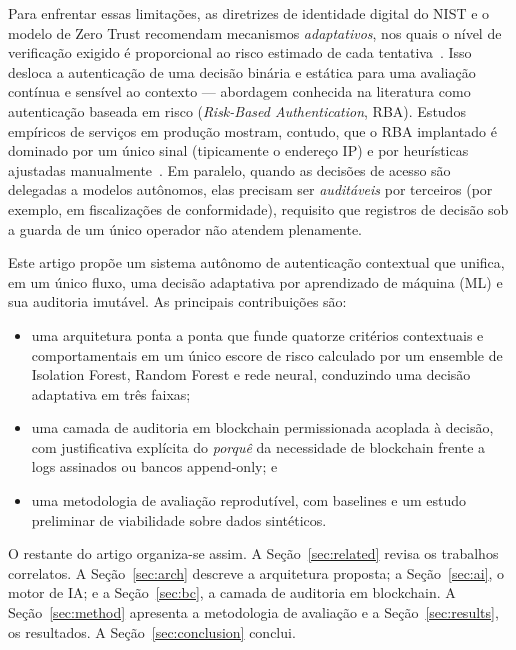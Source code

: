 \documentclass[conference]{IEEEtran}
\begin{document}
Para enfrentar essas limitações, as diretrizes de identidade digital do
NIST e o modelo de Zero Trust recomendam mecanismos \emph{adaptativos},
nos quais o nível de verificação exigido é proporcional ao risco
estimado de cada tentativa~\cite{nist80063b,rose2020}. Isso desloca a
autenticação de uma decisão binária e estática para uma avaliação
contínua e sensível ao contexto --- abordagem conhecida na literatura
como autenticação baseada em risco (\emph{Risk-Based Authentication},
RBA). Estudos empíricos de serviços em produção mostram, contudo, que o
RBA implantado é dominado por um único sinal (tipicamente o endereço IP)
e por heurísticas ajustadas manualmente~\cite{wiefling2019,wiefling2023}.
Em paralelo, quando as decisões de acesso são delegadas a modelos
autônomos, elas precisam ser \emph{auditáveis} por terceiros (por
exemplo, em fiscalizações de conformidade), requisito que registros de
decisão sob a guarda de um único operador não atendem plenamente.

Este artigo propõe um sistema autônomo de autenticação contextual que
unifica, em um único fluxo, uma decisão adaptativa por aprendizado de
máquina (ML) e sua auditoria imutável. As principais contribuições são:
\begin{itemize}
  \item uma arquitetura ponta a ponta que funde quatorze critérios
        contextuais e comportamentais em um único escore de risco
        calculado por um ensemble de Isolation Forest, Random Forest e
        rede neural, conduzindo uma decisão adaptativa em três faixas;
  \item uma camada de auditoria em blockchain permissionada acoplada à
        decisão, com justificativa explícita do \emph{porquê} da
        necessidade de blockchain frente a logs assinados ou bancos
        append-only; e
  \item uma metodologia de avaliação reprodutível, com baselines e um
        estudo preliminar de viabilidade sobre dados sintéticos.
\end{itemize}

O restante do artigo organiza-se assim. A Seção~\ref{sec:related} revisa
os trabalhos correlatos. A Seção~\ref{sec:arch} descreve a arquitetura
proposta; a Seção~\ref{sec:ai}, o motor de IA; e a Seção~\ref{sec:bc}, a
camada de auditoria em blockchain. A Seção~\ref{sec:method} apresenta a
metodologia de avaliação e a Seção~\ref{sec:results}, os resultados. A
Seção~\ref{sec:conclusion} conclui.
\end{document}
